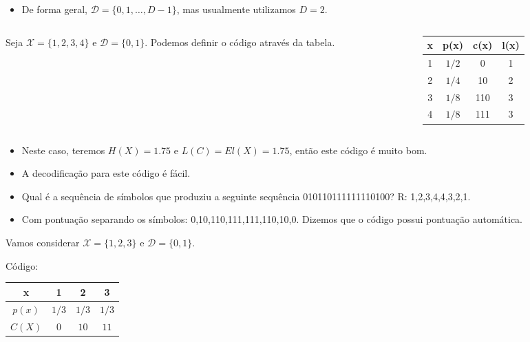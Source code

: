 \begin{frame}[allowframebreaks]
  \begin{itemize}
  \item De forma geral, $\mathcal{D} = \{0,1, \ldots, D-1\}$, mas usualmente utilizamos $D=2$.
  \end{itemize}
  \begin{example}
     \begin{columns}
     \begin{column}{0.45\textwidth}
	Seja $\mathcal{X} = \{1, 2, 3, 4\}$ e $\mathcal{D} = \{0, 1\}$. Podemos definir 
	o código através da tabela.
     \end{column}
     \begin{column}{0.45\textwidth}
	\begin{tabular}{c|c|c|c}
	x & p(x)  & c(x) & l(x) \\ \hline
	1 & $1/2$ & 0    & 1	\\
	2 & $1/4$ & 10   & 2	\\
	3 & $1/8$ & 110  & 3	\\
	4 & $1/8$ & 111  & 3	\\
	\end{tabular}
     \end{column}
     \end{columns}
    \examplebreak
    \begin{itemize}
    \item Neste caso, teremos $H(X) = 1.75$ e $L(C)=El(X)=1.75$, então este código é muito bom.
    \item A decodificação para este código é fácil.
    \item Qual é a sequência de símbolos que produziu a seguinte sequência 010110111111110100? R: 1,2,3,4,4,3,2,1.
    \item Com pontuação separando os símbolos: 0,10,110,111,111,110,10,0. Dizemos que o código possui pontuação
	automática.
    \end{itemize}
  \end{example}

  \framebreak

  \begin{example}
  Vamos considerar $\mathcal{X} = \{1,2,3\}$ e $\mathcal{D}=\{0,1\}$.
 
  Código:
  \begin{tabular}{cccc}
  x      &  1    &   2   &   3   \\ \hline
  $p(x)$ & $1/3$ & $1/3$ & $1/3$ \\ \hline
  $C(X)$ & $0$   & $10$  & $11$  
  \end{tabular}


\end{example}
\end{frame}
